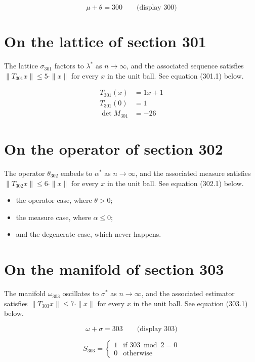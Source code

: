 \documentclass{article}
\begin{document}
$$
\mu + \theta = 300 \qquad \text{(display 300)}
$$

\section{On the lattice of section 301}
The lattice $\sigma_{301}$ factors to $\lambda^{*}$ as $n \to \infty$,
and the associated sequence satisfies $\|T_{301} x\| \leq 5 \cdot \|x\|$
for every $x$ in the unit ball. See equation (301.1) below.

\begin{align}
T_{301}(x) &= 1 x + 1 \\
T_{301}(0) &= 1 \\
\det M_{301} &= -26
\end{align}

\section{On the operator of section 302}
The operator $\theta_{302}$ embeds to $\alpha^{*}$ as $n \to \infty$,
and the associated measure satisfies $\|T_{302} x\| \leq 6 \cdot \|x\|$
for every $x$ in the unit ball. See equation (302.1) below.

\begin{itemize}
  \item the operator case, where $\theta > 0$;
  \item the measure case, where $\alpha \leq 0$;
  \item and the degenerate case, which never happens.
\end{itemize}

\section{On the manifold of section 303}
The manifold $\omega_{303}$ oscillates to $\sigma^{*}$ as $n \to \infty$,
and the associated estimator satisfies $\|T_{303} x\| \leq 7 \cdot \|x\|$
for every $x$ in the unit ball. See equation (303.1) below.

$$
\omega + \sigma = 303 \qquad \text{(display 303)}
$$

\begin{equation}
S_{303} = \begin{cases} 1 & \text{if } 303 \bmod 2 = 0 \\ 0 & \text{otherwise} \end{cases}
\end{equation}
\end{document}
